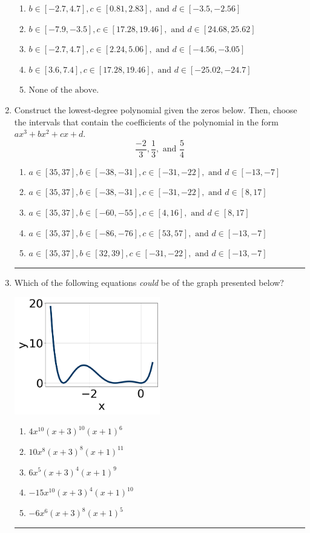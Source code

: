 \documentclass[14pt]{extbook}
\newcommand{\litem}[1]{\item#1\hspace*{-1cm}\rule{\textwidth}{0.4pt}}
\begin{document}
\begin{enumerate}
{\begin{enumerate}[label=\Alph*.]
\item \( b \in [-2.7, 4.7], c \in [0.81, 2.83], \text{ and } d \in [-3.5, -2.56] \)
\item \( b \in [-7.9, -3.5], c \in [17.28, 19.46], \text{ and } d \in [24.68, 25.62] \)
\item \( b \in [-2.7, 4.7], c \in [2.24, 5.06], \text{ and } d \in [-4.56, -3.05] \)
\item \( b \in [3.6, 7.4], c \in [17.28, 19.46], \text{ and } d \in [-25.02, -24.7] \)
\item \( \text{None of the above.} \)

\end{enumerate} }
\litem{
Construct the lowest-degree polynomial given the zeros below. Then, choose the intervals that contain the coefficients of the polynomial in the form $ax^3+bx^2+cx+d$.\[ \frac{-2}{3}, \frac{1}{3}, \text{ and } \frac{5}{4} \]\begin{enumerate}[label=\Alph*.]
\item \( a \in [35, 37], b \in [-38, -31], c \in [-31, -22], \text{ and } d \in [-13, -7] \)
\item \( a \in [35, 37], b \in [-38, -31], c \in [-31, -22], \text{ and } d \in [8, 17] \)
\item \( a \in [35, 37], b \in [-60, -55], c \in [4, 16], \text{ and } d \in [8, 17] \)
\item \( a \in [35, 37], b \in [-86, -76], c \in [53, 57], \text{ and } d \in [-13, -7] \)
\item \( a \in [35, 37], b \in [32, 39], c \in [-31, -22], \text{ and } d \in [-13, -7] \)

\end{enumerate} }
\litem{
Which of the following equations \textit{could} be of the graph presented below?
\begin{center}
    \includegraphics[width=0.5\textwidth]{../Figures/polyGraphToFunctionB.png}
\end{center}
\begin{enumerate}[label=\Alph*.]
\item \( 4x^{10} (x + 3)^{10} (x + 1)^{6} \)
\item \( 10x^{8} (x + 3)^{8} (x + 1)^{11} \)
\item \( 6x^{5} (x + 3)^{4} (x + 1)^{9} \)
\item \( -15x^{10} (x + 3)^{4} (x + 1)^{10} \)
\item \( -6x^{6} (x + 3)^{8} (x + 1)^{5} \)

\end{enumerate} }
\end{enumerate}
\end{document}
